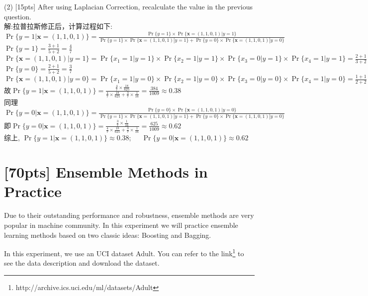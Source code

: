\documentclass{article}
\begin{document}
			(2) [15pts] After using Laplacian Correction, recalculate the value in the previous question.
\\解:拉普拉斯修正后，计算过程如下:\\
$\Pr\{ y=1 | \mathbf{x}=(1,1,0,1) \}=\frac{\Pr\{y=1\}\times\Pr\{\mathbf{x}=(1,1,0,1)|y=1\}}{\Pr\{y=1\}\times\Pr\{\mathbf{x}=(1,1,0,1)|y=1\}+\Pr\{y=0\}\times\Pr\{\mathbf{x}=(1,1,0,1)|y=0\}}$\\
$\Pr\{y=1\}=\frac{3+1}{5+2}=\frac{4}{7}$\\
$\Pr\{\mathbf{x}=(1,1,0,1)|y=1\}=\Pr\{x_1=1|y=1\}\times\Pr\{x_2=1|y=1\}\times\Pr\{x_3=0|y=1\}\times\Pr\{x_4=1|y=1\}=\frac{2+1}{3+2}\times\frac{1+1}{3+2}\times\frac{0+1}{3+2}\times\frac{2+1}{3+2}=\frac{18}{625}$\\
$\Pr\{y=0\}=\frac{2+1}{5+2}=\frac{3}{7}$\\
$\Pr\{\mathbf{x}=(1,1,0,1)|y=0\}=\Pr\{x_1=1|y=0\}\times\Pr\{x_2=1|y=0\}\times\Pr\{x_3=0|y=0\}\times\Pr\{x_4=1|y=0\}=\frac{1+1}{2+2}\times\frac{1+1}{2+2}\times\frac{1+1}{2+2}\times\frac{1+1}{2+2}=\frac{1}{16}$\\
故$\Pr\{ y=1 | \mathbf{x}=(1,1,0,1) \}=\frac{\frac{4}{7}\times \frac{18}{625}}{\frac{4}{7}\times \frac{18}{625} +\frac{3}{7}\times\frac{1}{16}}=\frac{384}{1009}\approx 0.38$\\
同理$\Pr\{ y=0 | \mathbf{x}=(1,1,0,1) \}=\frac{\Pr\{y=0\}\times\Pr\{\mathbf{x}=(1,1,0,1)|y=0\}}{\Pr\{y=1\}\times\Pr\{\mathbf{x}=(1,1,0,1)|y=1\}+\Pr\{y=0\}\times\Pr\{\mathbf{x}=(1,1,0,1)|y=0\}}$\\
即$\Pr\{ y=0 | \mathbf{x}=(1,1,0,1) \}=\frac{\frac{3}{7}\times \frac{1}{16}}{\frac{4}{7}\times \frac{18}{625} +\frac{3}{7}\times\frac{1}{16}}=\frac{625}{1009}\approx 0.62$\\
综上, $\Pr\{ y=1 | \mathbf{x}=(1,1,0,1) \}\approx 0.38$;\ \ \ $\Pr\{ y=0 | \mathbf{x}=(1,1,0,1) \}\approx 0.62$\\
			

	\section{[70pts] Ensemble Methods in Practice}
	
	Due to their outstanding performance and robustness, ensemble methods are very popular in machine community. In this experiment we will practice ensemble learning methods based on two classic
	ideas: Boosting and Bagging.
	
	In this experiment, we use an UCI dataset Adult. You can refer to the link\footnote{http://archive.ics.uci.edu/ml/datasets/Adult} to see the data description and download the dataset.
	
\end{document}
